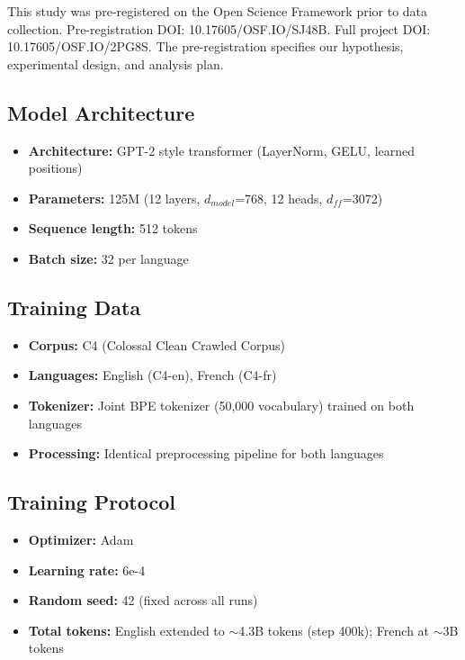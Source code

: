 \documentclass[11pt,a4paper]{article}
\begin{document}
This study was pre-registered on the Open Science Framework prior to data collection. Pre-registration DOI: 10.17605/OSF.IO/SJ48B. Full project DOI: 10.17605/OSF.IO/2PG8S. The pre-registration specifies our hypothesis, experimental design, and analysis plan.

\subsection{Model Architecture}

\begin{itemize}
    \item \textbf{Architecture:} GPT-2 style transformer (LayerNorm, GELU, learned positions)
    \item \textbf{Parameters:} 125M (12 layers, $d_{model}$=768, 12 heads, $d_{ff}$=3072)
    \item \textbf{Sequence length:} 512 tokens
    \item \textbf{Batch size:} 32 per language
\end{itemize}

\subsection{Training Data}

\begin{itemize}
    \item \textbf{Corpus:} C4 (Colossal Clean Crawled Corpus)
    \item \textbf{Languages:} English (C4-en), French (C4-fr)
    \item \textbf{Tokenizer:} Joint BPE tokenizer (50,000 vocabulary) trained on both languages
    \item \textbf{Processing:} Identical preprocessing pipeline for both languages
\end{itemize}

\subsection{Training Protocol}

\begin{itemize}
    \item \textbf{Optimizer:} Adam
    \item \textbf{Learning rate:} 6e-4
    \item \textbf{Random seed:} 42 (fixed across all runs)
    \item \textbf{Total tokens:} English extended to $\sim$4.3B tokens (step 400k); French at $\sim$3B tokens
\end{itemize}
\end{document}
